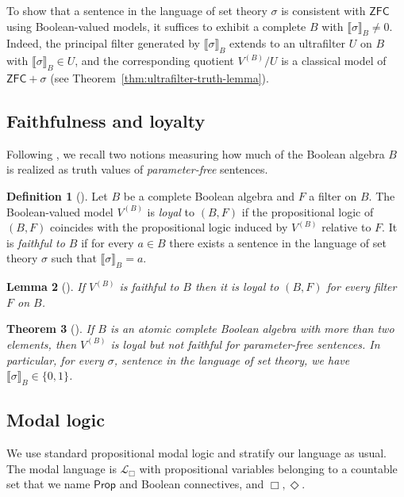 \documentclass[11pt]{amsart}
\theoremstyle{definition}
\newtheorem{definition}{Definition}[section]
\theoremstyle{plain}
\newtheorem{theorem}[definition]{Theorem}
\newtheorem{lemma}[definition]{Lemma}
\newcommand{\Prop}{\mathsf{Prop}}
\newcommand{\Lbox}{\mathcal L_{\Box}} %
\newcommand{\val}[1]{\llbracket #1\rrbracket_B}
\begin{document}
To show that a sentence in the language of set theory $\sigma$ is consistent with $\mathsf{ZFC}$ using Boolean-valued
models, it suffices to exhibit a complete $B$ with $\val{\sigma}\ne 0$.
Indeed, the principal filter generated by $\val{\sigma}$ extends to an ultrafilter $U$ on $B$ with
$\val{\sigma}\in U$, and the corresponding quotient $V^{(B)}/U$ is a classical model of $\mathsf{ZFC}+\sigma$
(see Theorem~\ref{thm:ultrafilter-truth-lemma}).

\subsection{Faithfulness and loyalty}

Following \cite{LowePassmannTarafder}, we recall two notions measuring how much of the Boolean algebra $B$
is realized as truth values of \emph{parameter-free} sentences.

\begin{definition}[\cite{LowePassmannTarafder}]\label{def:faithful-loyal}
Let $B$ be a complete Boolean algebra and $F$ a filter on $B$.
The Boolean-valued model $V^{(B)}$ is \emph{loyal} to $(B,F)$ if the propositional logic of $(B,F)$
coincides with the propositional logic induced by $V^{(B)}$ relative to $F$.
It is \emph{faithful to $B$} if for every $a\in B$ there exists a sentence in the language of set theory $\sigma$ such that $\val{\sigma}=a$.
\end{definition}

\begin{lemma}[\cite{LowePassmannTarafder}]\label{lem:faithful-implies-loyal}
If $V^{(B)}$ is faithful to $B$ then it is loyal to $(B,F)$ for every filter $F$ on $B$.
\end{lemma}

\begin{theorem}[\cite{LowePassmannTarafder}]\label{thm:atomic-not-faithful}
If $B$ is an atomic complete Boolean algebra with more than two elements, then $V^{(B)}$ is loyal but not
faithful for parameter-free sentences. In particular, for every $\sigma$, sentence in the language of set theory,  we have
$\val{\sigma}\in\{0,1\}$.
\end{theorem}

\subsection{Modal logic}

We use standard propositional modal logic and stratify our language as usual.
The modal language is $\Lbox$ with propositional variables belonging to a countable set that we name $\Prop$ and Boolean connectives, and $\Box,\Diamond$.
\end{document}
